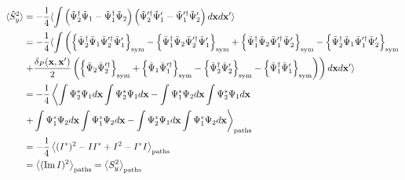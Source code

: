 \begin{equation*}
\begin{split}
	\langle \hat{S}^2_y \rangle
	& = - \frac{1}{4} \langle \int \left(
		\tilde{\Psi}^\dagger_2 \tilde{\Psi}_1 - \tilde{\Psi}^\dagger_1 \tilde{\Psi}_2
	\right)
	\left(
		\tilde{\Psi}^{\prime\dagger}_2 \tilde{\Psi}^\prime_1 - \tilde{\Psi}^{\prime\dagger}_1 \tilde{\Psi}^\prime_2
	\right) d\mathbf{x} d\mathbf{x}^\prime \rangle \\
	& = - \frac{1}{4} \langle \int \left(
		\left\{  \tilde{\Psi}^\dagger_2 \tilde{\Psi}_1 \tilde{\Psi}^{\prime\dagger}_2 \tilde{\Psi}^\prime_1  \right\}_{\mathrm{sym}}
		- \left\{  \tilde{\Psi}^\dagger_1 \tilde{\Psi}_2 \tilde{\Psi}^{\prime\dagger}_2 \tilde{\Psi}^\prime_1  \right\}_{\mathrm{sym}}
		+ \left\{  \tilde{\Psi}^\dagger_1 \tilde{\Psi}_2 \tilde{\Psi}^{\prime\dagger}_1 \tilde{\Psi}^\prime_2  \right\}_{\mathrm{sym}}
		- \left\{  \tilde{\Psi}^\dagger_2 \tilde{\Psi}_1 \tilde{\Psi}^{\prime\dagger}_1 \tilde{\Psi}^\prime_2  \right\}_{\mathrm{sym}}
	\right. \\
	& \left.
		+ \frac{\delta_P(\mathbf{x},\mathbf{x}^\prime)}{2} \left(
			\left\{  \tilde{\Psi}_2 \tilde{\Psi}^{\prime\dagger}_2  \right\}_{\mathrm{sym}}
			+ \left\{  \tilde{\Psi}_1 \tilde{\Psi}^{\prime\dagger}_1  \right\}_{\mathrm{sym}}
			- \left\{  \tilde{\Psi}^\dagger_2 \tilde{\Psi}^\prime_2  \right\}_{\mathrm{sym}}
			- \left\{  \tilde{\Psi}^\dagger_1 \tilde{\Psi}^\prime_1  \right\}_{\mathrm{sym}}
		\right)
	\right) d\mathbf{x} d\mathbf{x}^\prime \rangle \\
	& = - \frac{1}{4} \left\langle
		\int \Psi^*_2 \Psi_1 d\mathbf{x} \int \Psi^*_2 \Psi_1 d\mathbf{x}
		- \int \Psi^*_1 \Psi_2 d\mathbf{x} \int \Psi^*_2 \Psi_1 d\mathbf{x} \right. \\
	&	\left. + \int \Psi^*_1 \Psi_2 d\mathbf{x} \int \Psi^*_1 \Psi_2 d\mathbf{x}
		- \int \Psi^*_2 \Psi_1 d\mathbf{x} \int \Psi^*_1 \Psi_2 d\mathbf{x} \right\rangle_{\mathrm{paths}} \\
	& = - \frac{1}{4} \left\langle  (I^*)^2 - I I^* + I^2 - I^* I  \right\rangle_{\mathrm{paths}} \\
	& = \left\langle  ( \operatorname{Im} I )^2  \right\rangle_{\mathrm{paths}} = \left\langle  S^2_y  \right\rangle_{\mathrm{paths}}
\end{split}
\end{equation*}

